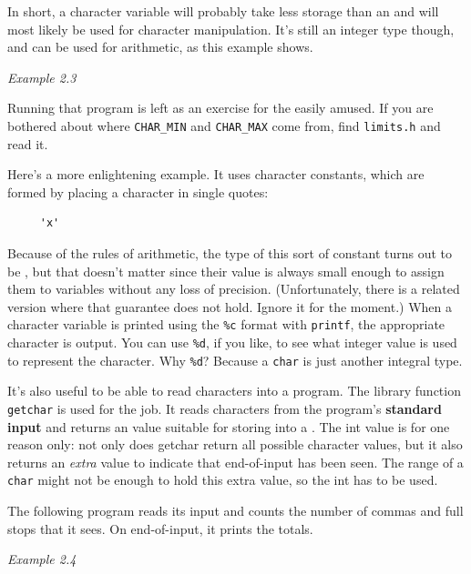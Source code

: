    In short, a character variable will probably take less storage than an
    \kint{} and will most likely be used for character manipulation.
    It's still an integer type though, and can be used for arithmetic, as this
    example shows.


    \begin{center}\textit{Example 2.3}\end{center}


   Running that program is left as an exercise for the easily amused. If
    you are bothered about where \texttt{CHAR\_MIN} and
    \texttt{CHAR\_MAX} come from, find \texttt{limits.h} and read
    it.


   Here's a more enlightening example. It uses character constants, which
    are formed by placing a character in single quotes:


   \begin{Verbatim}
     'x'
   \end{Verbatim}

   Because of the rules of arithmetic, the type of this sort of constant
    turns out to be \kint, but that doesn't matter since their
    value is always small enough to assign them to \kchar{} variables
    without any loss of precision. (Unfortunately, there is a related version
    where that guarantee does not hold. Ignore it for the moment.) When a
    character variable is printed using the \texttt{\%c} format with
    \texttt{printf}, the appropriate character is output. You can use
    \texttt{\%d}, if you like, to see what integer value is used to
    represent the character. Why \texttt{\%d}? Because a \texttt{char}
    is just another integral type.


   It's also useful to be able to read characters into a program. The
    library function \texttt{getchar} is used for the job. It reads
    characters from the program's \textbf{standard input} and returns an
    \kint{} value suitable for storing into a \kchar. The
    int value is for one reason only: not only does getchar return all
    possible character values, but it also returns an \textit{extra} value to
    indicate that end-of-input has been seen. The range of a \texttt{char}
    might not be enough to hold this extra value, so the int has to be
    used.


   The following program reads its input and counts the number of commas
    and full stops that it sees. On end-of-input, it prints the totals.


    \begin{center}\textit{Example 2.4}\end{center}


